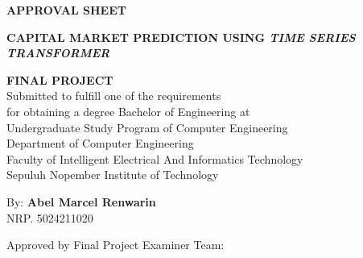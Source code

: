 \begin{center}
  \large
  \textbf{APPROVAL SHEET}
\end{center}

\thispagestyle{empty}

\begin{center}
  \textbf{{CAPITAL MARKET PREDICTION USING \textit{TIME SERIES TRANSFORMER}}}
\end{center}

\begingroup
\small

\begin{center}
  \textbf{FINAL PROJECT}
  \\Submitted to fulfill one of the requirements \\
  for obtaining a degree Bachelor of Engineering at \\
  Undergraduate Study Program of {Computer Engineering} \\
  Department of {Computer Engineering} \\
  Faculty of Intelligent Electrical And Informatics Technology \\
  Sepuluh Nopember Institute of Technology
\end{center}

\begin{center}
  By: \textbf{Abel Marcel Renwarin}
  \\NRP. 5024211020
\end{center}

\begin{center}
  Approved by Final Project Examiner Team:
\end{center}

\begingroup
\setlength{\tabcolsep}{0pt}

